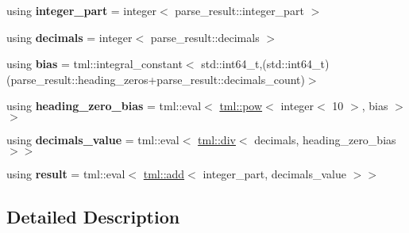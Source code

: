 \begin{DoxyCompactItemize}
\item 
\hypertarget{structtml_1_1floating_1_1impl_1_1parse__float_a62fa2ec7fbce4f8f974b5731b6fb55eb}{using {\bfseries integer\+\_\+part} = integer$<$ parse\+\_\+result\+::integer\+\_\+part $>$}\label{structtml_1_1floating_1_1impl_1_1parse__float_a62fa2ec7fbce4f8f974b5731b6fb55eb}

\item 
\hypertarget{structtml_1_1floating_1_1impl_1_1parse__float_acb8bb1c74d235b503fb10638a9a8f825}{using {\bfseries decimals} = integer$<$ parse\+\_\+result\+::decimals $>$}\label{structtml_1_1floating_1_1impl_1_1parse__float_acb8bb1c74d235b503fb10638a9a8f825}

\item 
\hypertarget{structtml_1_1floating_1_1impl_1_1parse__float_abebfb81054e378d1baa7e47f9c98984d}{using {\bfseries bias} = tml\+::integral\+\_\+constant$<$ std\+::int64\+\_\+t,(std\+::int64\+\_\+t)(parse\+\_\+result\+::heading\+\_\+zeros+parse\+\_\+result\+::decimals\+\_\+count)$>$}\label{structtml_1_1floating_1_1impl_1_1parse__float_abebfb81054e378d1baa7e47f9c98984d}

\item 
\hypertarget{structtml_1_1floating_1_1impl_1_1parse__float_a47b3aca0afa00a61a15eccc18bb4227f}{using {\bfseries heading\+\_\+zero\+\_\+bias} = tml\+::eval$<$ \hyperlink{structtml_1_1pow}{tml\+::pow}$<$ integer$<$ 10 $>$, bias $>$$>$}\label{structtml_1_1floating_1_1impl_1_1parse__float_a47b3aca0afa00a61a15eccc18bb4227f}

\item 
\hypertarget{structtml_1_1floating_1_1impl_1_1parse__float_a7a8c1c3093ef6f7f108ee001da8a305c}{using {\bfseries decimals\+\_\+value} = tml\+::eval$<$ \hyperlink{structtml_1_1div}{tml\+::div}$<$ decimals, heading\+\_\+zero\+\_\+bias $>$$>$}\label{structtml_1_1floating_1_1impl_1_1parse__float_a7a8c1c3093ef6f7f108ee001da8a305c}

\item 
\hypertarget{structtml_1_1floating_1_1impl_1_1parse__float_aee2735aec0ab24e0d972fc71da948adf}{using {\bfseries result} = tml\+::eval$<$ \hyperlink{structtml_1_1add}{tml\+::add}$<$ integer\+\_\+part, decimals\+\_\+value $>$$>$}\label{structtml_1_1floating_1_1impl_1_1parse__float_aee2735aec0ab24e0d972fc71da948adf}

\end{DoxyCompactItemize}


\subsection{Detailed Description}
